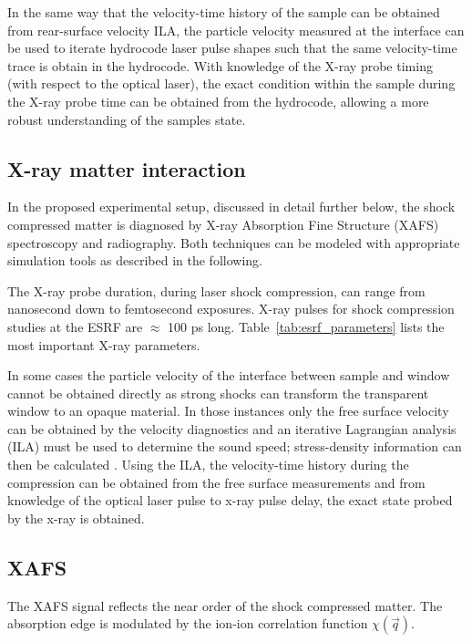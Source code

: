 \documentclass[12pt]{scrartcl}
\begin{document}
In the same way that the velocity-time history of the sample can be obtained from rear-surface velocity ILA, the particle velocity measured at the interface can be used to iterate hydrocode laser pulse shapes such that the same velocity-time trace is obtain in the hydrocode. With knowledge of the X-ray probe timing (with respect to the optical laser), the exact condition within the sample during the X-ray probe time can be obtained from the hydrocode, allowing a more robust understanding of the samples state.

\subsection{X-ray matter interaction}
In the proposed experimental setup, discussed in detail further below, the shock compressed matter is diagnosed by
X-ray Absorption Fine Structure (XAFS) spectroscopy and radiography. Both techniques can be modeled with appropriate simulation tools as
described in the following.

The X-ray probe duration, during laser shock compression, can range from nanosecond down to femtosecond exposures.
X-ray pulses for shock compression studies at the ESRF are $\approx$ 100 ps long. Table~\ref{tab:esrf_parameters} lists the most important X-ray parameters.

In some cases the particle velocity of the interface between sample and window cannot be obtained directly as strong shocks can transform the transparent window to an opaque
material. In those instances only the free surface velocity can be obtained by the velocity diagnostics and an iterative Lagrangian analysis (ILA) must be used to determine the sound
speed; stress-density information can then be calculated \cite{Rothman2006}.  Using the ILA, the velocity-time history during the compression can be obtained from the free surface measurements and from knowledge of the optical laser pulse to x-ray pulse delay, the exact state probed by the x-ray is obtained.
\subsection{XAFS}
The XAFS signal reflects the near order of the shock compressed matter. The absorption edge is modulated by the ion-ion correlation function
$\chi(\vec q)$.
\end{document}
